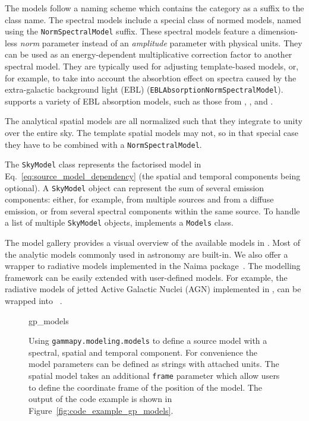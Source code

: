 \documentclass[longauth]{aa}
\newcommand{\code}[1]{\texttt{#1}}
\begin{document}
The models follow a naming scheme which contains the category as a suffix to
the class name. The spectral models include a special class of normed models,
named using the \code{NormSpectralModel} suffix.
These spectral models feature a dimension-less \textit{norm} parameter
instead of an \textit{amplitude} parameter with physical units. They
can be used as an energy-dependent multiplicative correction
factor to another spectral model. They are typically used for
adjusting template-based models, or, for example, to take into account
the absorbtion effect on \gammaray spectra caused by the extra-galactic background
light (EBL) (\code{EBLAbsorptionNormSpectralModel}). \gammapy supports a variety
of EBL absorption models, such as those from \cite{Franceschini2008}, \cite{Finke2010},
and \cite{Dominguez2011}.

The analytical spatial models are all normalized such that they integrate to
unity over the entire sky. The template spatial models may not, so in that special
case they have to be combined with a \code{NormSpectralModel}.

The \code{SkyModel} class represents the factorised model in Eq.~\ref{eq:source_model_dependency}
(the spatial and temporal components being optional).
A \code{SkyModel} object can represent the sum of several emission components:
either, for example, from multiple sources and from a diffuse emission, or from several spectral
components within the same source. To handle a list of multiple \code{SkyModel} objects, \gammapy
implements a \code{Models} class.

The model gallery provides a visual overview of the available models in
\gammapy. Most of the analytic models commonly used in \gammaray astronomy are
built-in. We also offer a wrapper to radiative models implemented in the Naima
package~\citep{naima}. The modelling framework can be easily extended with
user-defined models. For example, the radiative models of jetted Active Galactic Nuclei (AGN)
implemented in \agnpy, can be wrapped into \gammapy~\citep[see Section 3.5 of ][]{2022A&A...660A..18N}.

\begin{figure}
	\small
	{gp_models}
	\caption{Using \code{gammapy.modeling.models} to define a source model with a
    spectral, spatial and temporal component. For convenience the model
    parameters can be defined as strings with attached units. The spatial model
    takes an additional \code{frame} parameter which allow users to define
    the coordinate frame of the position of the model. The output
	of the code example is shown in Figure~\ref{fig:code_example_gp_models}.
    }
	\label{fig*:minted:gp_models}
\end{figure}
\end{document}
